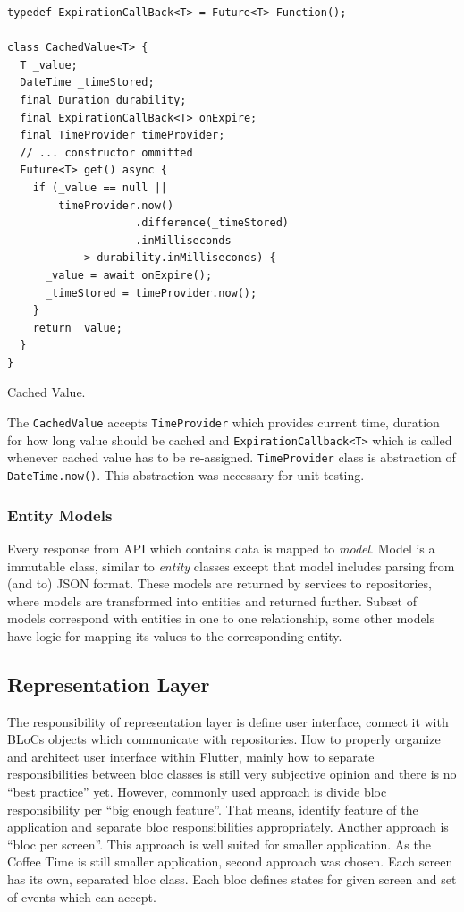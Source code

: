 \begin{listing}[ht]
\begin{verbatim}
typedef ExpirationCallBack<T> = Future<T> Function();

class CachedValue<T> {
  T _value;
  DateTime _timeStored;
  final Duration durability;
  final ExpirationCallBack<T> onExpire;
  final TimeProvider timeProvider;
  // ... constructor ommitted
  Future<T> get() async {
    if (_value == null ||
        timeProvider.now()
                    .difference(_timeStored)
                    .inMilliseconds 
            > durability.inMilliseconds) {
      _value = await onExpire();
      _timeStored = timeProvider.now();
    }
    return _value;
  }
}
\end{verbatim}
\caption{Cached Value.}
\label{listing:ct-cached-value}
\end{listing}

The \verb|CachedValue| accepts \verb|TimeProvider| which provides current time, duration for how long value should be cached and \verb|ExpirationCallback<T>| which is called whenever cached value has to be re-assigned. \verb|TimeProvider| class is abstraction of \verb|DateTime.now()|. This abstraction was necessary for unit testing.   

\subsubsection{Entity Models}
Every response from API which contains data is mapped to \textit{model}. Model is a immutable class, similar to \textit{entity} classes except that model includes parsing from (and to) JSON format. These models are returned by services to repositories, where models are transformed into entities and returned further. Subset of models correspond with entities in one to one relationship, some other models have logic for mapping its values to the corresponding entity. 
\subsection{Representation Layer}
The responsibility of representation layer is define user interface, connect it with BLoCs objects which communicate with repositories. How to properly organize and architect user interface within Flutter, mainly how to separate responsibilities between \gls{bloc} classes is still very subjective opinion and there is no ``best practice'' yet. However, commonly used approach is divide \gls{bloc} responsibility per ``big enough feature''. That means, identify feature of the application and separate \gls{bloc} responsibilities appropriately. Another approach is ``\gls{bloc} per screen''. This approach is well suited for smaller application. As the Coffee Time is still smaller application, second approach was chosen. Each screen has its own, separated \gls{bloc} class. Each \gls{bloc} defines states for given screen and set of events which can accept.  

